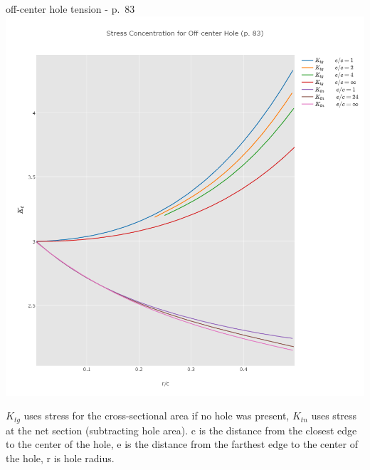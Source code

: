 \documentclass[
  letterpaper,
  ignorenonframetext,
  aspectratio=43,
  handout,
  12pt]{beamer}
\let\Oldincludegraphics\includegraphics
\renewcommand{\includegraphics}[2][]{\Oldincludegraphics[width=\textwidth,height=0.7\textheight,keepaspectratio]{#2}}
\begin{document}
\begin{frame}{off-center hole tension - p.~83}
\protect\hypertarget{off-center-hole-tension---p.-83}{}
\includegraphics{../images/Kt-offcenter-hole.png}

\(K_{tg}\) uses stress for the cross-sectional area if no hole was
present, \(K_{tn}\) uses stress at the net section (subtracting hole
area). c is the distance from the closest edge to the center of the
hole, e is the distance from the farthest edge to the center of the
hole, r is hole radius.
\end{frame}
\end{document}
